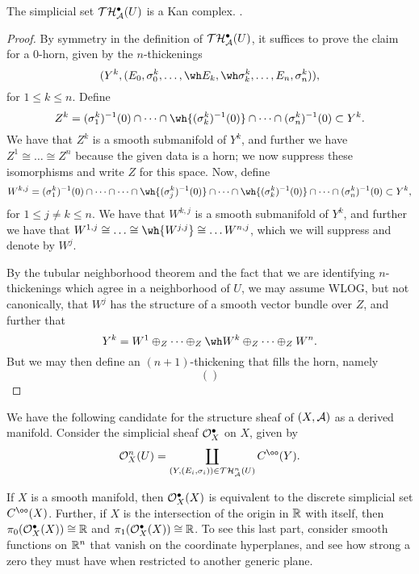 \begin{prop}\label{kan-complexes}
The simplicial set $\mathcal T \mathcal H_\mathcal A^\bullet(U)$ is a Kan complex. .
\end{prop}

\begin{proof}
By symmetry in the definition of $\mathcal T \mathcal H_\mathcal A^\bullet(U)$, it suffices to prove the claim for a $0$-horn, given by the $n$-thickenings
\[ (Y^k, (E_0, \sigma_0^k, \dots, \wh E_k, \wh \sigma_k^k, \dots, E_n, \sigma_n^k)), \]
for $1 \leq k \leq n$. Define
\[ Z^k = (\sigma_1^k)^{-1}(0) \cap \dots \cap \wh {(\sigma_k^k)^{-1}(0)} \cap \dots \cap (\sigma_n^k)^{-1}(0) \subset Y^k. \]
We have that $Z^k$ is a smooth submanifold of $Y^k$, and further we have $Z^1 \cong \dots \cong Z^n$ because the given data is a horn; we now suppress these isomorphisms and write $Z$ for this space. Now, define
\[ W^{k, j} = (\sigma_1^k)^{-1}(0) \cap \dots \cap \dots \cap \wh {(\sigma_j^k)^{-1}(0)} \cap \dots \cap \wh {(\sigma_k^k)^{-1}(0)} \cap \dots \cap (\sigma_n^k)^{-1}(0) \subset Y^k, \]
for $1 \leq j \neq k \leq n$. We have that $W^{k, j}$ is a smooth submanifold of $Y^k$, and further we have that $W^{1, j} \cong \dots \cong \wh {W^{j, j}} \cong \dots W^{n, j}$, which we will suppress and denote by $W^j$.

By the tubular neighborhood theorem and the fact that we are identifying $n$-thickenings which agree in a neighborhood of $U$, we may assume WLOG, but not canonically, that $W^j$ has the structure of a smooth vector bundle over $Z$, and further that
\[ Y^k = W^1 \oplus_Z \dots \oplus_Z \wh W^k \oplus_Z \dots \oplus_Z W^n. \]
But we may then define an $(n + 1)$-thickening that fills the horn, namely
\[ \left(  \right) \]
\end{proof}


We have the following candidate for the structure sheaf of $(X, \mathcal A)$ as a derived manifold. Consider the simplicial sheaf $\mathcal O_X^\bullet$ on $X$, given by
\[ \cO_X^n(U) = \coprod_{(Y, (E_i, \sigma_i)) \in \cT \cH_\cA^n(U)} C^\oo(Y). \]

\begin{speculation}
If $X$ is a smooth manifold, then $\mathcal O_X^\bullet(X)$ is equivalent to the discrete simplicial set $C^\oo(X)$. Further, if $X$ is the intersection of the origin in $\mathbb R$ with itself, then $\pi_0(\mathcal O_X^\bullet(X)) \cong \mathbb R$ and $\pi_1(\mathcal O_X^\bullet(X)) \cong \mathbb R$. To see this last part, consider smooth functions on $\mathbb R^n$ that vanish on the coordinate hyperplanes, and see how strong a zero they must have when restricted to another generic plane.
\end{speculation}